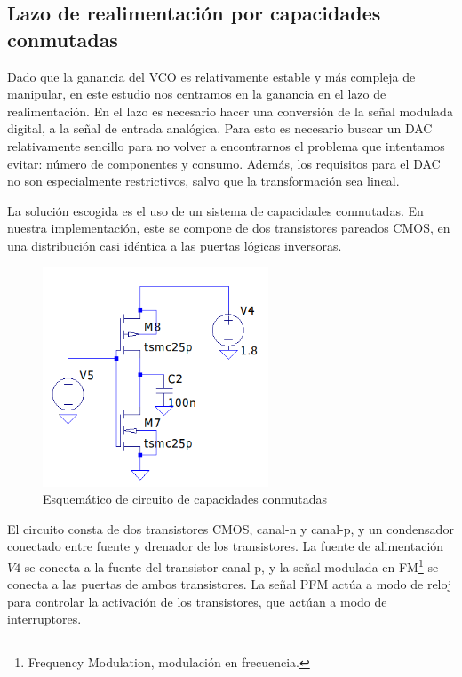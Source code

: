 \documentclass[12pt]{report} %
\begin{document}
	\subsection{Lazo de realimentación por capacidades conmutadas}
	
	Dado que la ganancia del VCO es relativamente estable y más compleja de manipular, en este estudio nos centramos en la ganancia en el lazo de realimentación. En el lazo es necesario hacer una conversión de la señal modulada digital, a la señal de entrada analógica. Para esto es necesario buscar un DAC relativamente sencillo para no volver a encontrarnos el problema que intentamos evitar: número de componentes y consumo. Además, los requisitos para el DAC no son especialmente restrictivos, salvo que la transformación sea lineal.
	
	
	La solución escogida es el uso de un sistema de capacidades conmutadas. En nuestra implementación, este se compone de dos transistores pareados CMOS, en una distribución casi idéntica a las puertas lógicas inversoras.
	
	\begin{figure}[H]
		\includegraphics[width=0.6\textwidth]{sw-capacities-sch.png}
		\caption[Esquemático de circuito de capacidades conmutadas]{Esquemático de circuito de capacidades conmutadas}
		\label{fig:sw-capacities-sch.png}
	\end{figure}
	
	El circuito consta de dos transistores CMOS, canal-n y canal-p, y un condensador conectado entre fuente y drenador de los transistores. La fuente de alimentación $V4$ se conecta a la fuente del transistor canal-p, y la señal modulada en FM\footnote{Frequency Modulation, modulación en frecuencia.} se conecta a las puertas de ambos transistores. La señal PFM actúa a modo de reloj para controlar la activación de los transistores, que actúan a modo de interruptores.
	
\end{document}

